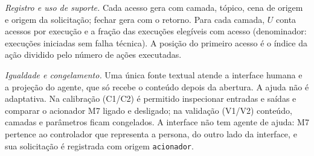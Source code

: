 \par\textit{Registro e uso de suporte.} Cada acesso gera  com camada, tópico, cena de origem e origem da solicitação; fechar gera  com o retorno. Para cada camada, $U$ conta acessos por execução e a fração das execuções elegíveis com acesso (denominador: execuções iniciadas sem falha técnica). A posição do primeiro acesso é o índice da ação dividido pelo número de ações executadas.
\par\textit{Igualdade e congelamento.} Uma única fonte textual atende a interface humana e a projeção do agente, que só recebe o conteúdo depois da abertura. A ajuda não é adaptativa. Na calibração (C1/C2) é permitido inspecionar entradas e saídas e comparar o acionador M7 ligado e desligado; na validação (V1/V2) conteúdo, camadas e parâmetros ficam congelados. A interface não tem agente de ajuda: M7 pertence ao controlador que representa a persona, do outro lado da interface, e sua solicitação é registrada com origem \texttt{acionador}.
